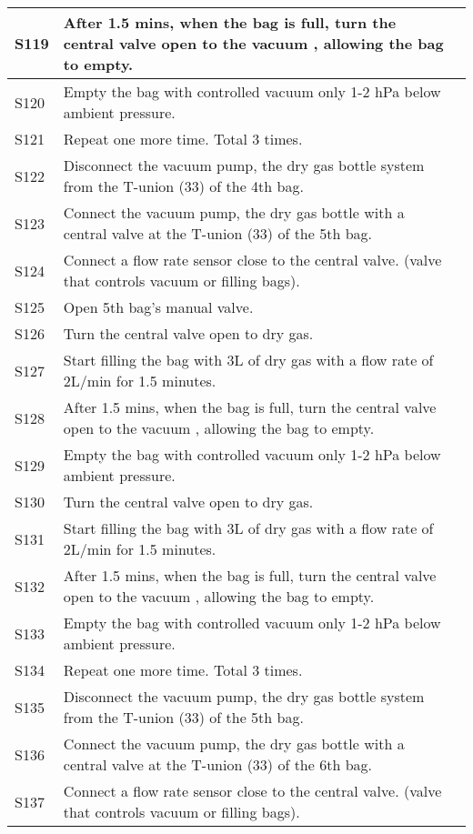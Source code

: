 \begin{longtable} {|m{}|m{}|m{}|}
S119 & After 1.5 mins, when the bag is full, turn the central valve open to the vacuum , allowing the bag to empty. & \\ \hline
S120 & Empty the bag with controlled vacuum only 1-2 hPa below ambient pressure. & \\ \hline
S121 & Repeat one more time. Total 3 times. & \\ \hline
S122 & Disconnect the vacuum pump, the dry gas bottle system from the T-union (33) of the 4th bag. & \\ \hline
S123 & Connect the vacuum pump, the dry gas bottle with a central valve at the T-union (33) of the 5th bag. & \\ \hline
S124 & Connect a flow rate sensor close to the central valve. (valve that controls vacuum or filling bags). & \\ \hline
S125 & Open 5th bag's manual valve. & \\ \hline
S126 & Turn the central valve open to dry gas. & \\ \hline
S127 & Start filling the bag with 3L of dry gas with a flow rate of 2L/min for 1.5 minutes. & \\ \hline
S128 & After 1.5 mins, when the bag is full, turn the central valve open to the vacuum , allowing the bag to empty. & \\ \hline
S129 & Empty the bag with controlled vacuum only 1-2 hPa below ambient pressure. & \\ \hline
S130 & Turn the central valve open to dry gas. & \\ \hline
S131 & Start filling the bag with 3L of dry gas with a flow rate of 2L/min for 1.5 minutes. & \\ \hline
S132 & After 1.5 mins, when the bag is full, turn the central valve open to the vacuum , allowing the bag to empty. & \\ \hline
S133 & Empty the bag with controlled vacuum only 1-2 hPa below ambient pressure. & \\ \hline
S134 & Repeat one more time. Total 3 times. & \\ \hline
S135 & Disconnect the vacuum pump, the dry gas bottle system from the T-union (33) of the 5th bag. & \\ \hline
S136 & Connect the vacuum pump, the dry gas bottle with a central valve at the T-union (33) of the 6th bag. & \\ \hline
S137 & Connect a flow rate sensor close to the central valve. (valve that controls vacuum or filling bags). & \\ \hline

\end{longtable}
